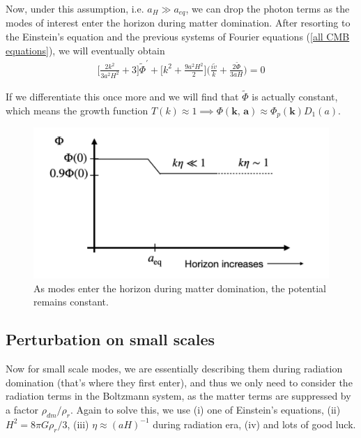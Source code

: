 \documentclass[a4paper, 12pt]{article}
\begin{document}
{{          Now, under this assumption, i.e. \( a_{H} \gg a_{eq} \),
          we can drop the photon terms as the modes of interest
          enter the horizon during matter domination. After
          resorting to the Einstein's equation and the previous
          systems of Fourier equations (\ref{all CMB equations}),
          we will eventually obtain 
          \begin{align}
            \label{horizon crossing ~ 1 equation}
            \bigg[\frac{2k^2}{3 a^2 H^2} + 3 \bigg]
            \tilde{\Phi}^{\prime} + \bigg[k^2 + \frac{9a^2
            H^2}{2}\bigg]
           \bigg(\frac{i \tilde{v}}{k} + \frac{2
          \tilde{\Phi}}{3 a H} \bigg) = 0 
          \end{align}
    
          If we differentiate this once more and we will find that
          \( \tilde{\Phi} \) is actually constant, which means the
          growth function \( T(k) \approx 1 \implies
          \Phi(\textbf{k, a}) \approx \Phi_{p}(\textbf{k}) D_1 (a)
          \).

          \begin{figure}[h!]
          \begin{center}
            \includegraphics[scale=0.4]{Figures/finn2.png}
          \end{center}
          \caption{As modes enter the horizon during matter
            domination, the potential remains constant.}
          \label{fig:finn2}
          \end{figure}
         
         \subsection{Perturbation on small scales}%
          \label{sub:Perturbation on small scales}
          Now for small scale modes, we are essentially describing
          them during radiation domination (that's where they
          first enter), and thus we only need to consider the
          radiation terms in the Boltzmann system, as the matter
          terms are suppressed by a factor \( \rho_{dm} / \rho_r
          \). Again to solve this, we use (i) one of Einstein's
          equations, (ii) \( H^2 = 8 \pi G \rho_r /3 \), (iii) \(
          \eta \approx (aH)^{-1}\) during radiation era, (iv) and
          lots of good luck. 

}}
\end{document}
